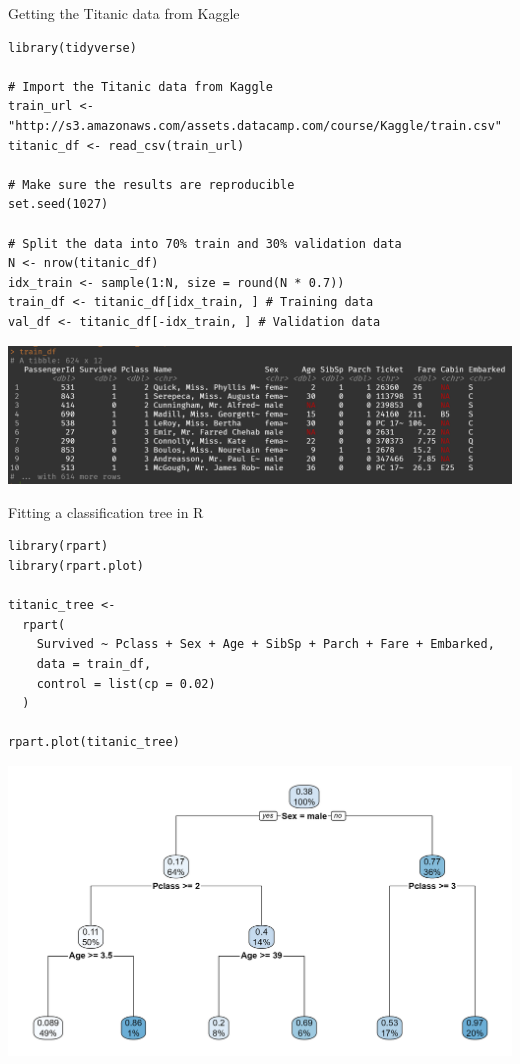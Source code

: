 \documentclass[xcolor=table,aspectratio=169]{beamer}
\begin{document}
\begin{frame}[fragile]{Getting the Titanic data from Kaggle}
	\begin{scriptsize}
		\begin{verbatim}
library(tidyverse)

# Import the Titanic data from Kaggle
train_url <- 
"http://s3.amazonaws.com/assets.datacamp.com/course/Kaggle/train.csv"
titanic_df <- read_csv(train_url)

# Make sure the results are reproducible
set.seed(1027)

# Split the data into 70% train and 30% validation data
N <- nrow(titanic_df)
idx_train <- sample(1:N, size = round(N * 0.7))
train_df <- titanic_df[idx_train, ] # Training data
val_df <- titanic_df[-idx_train, ] # Validation data
\end{verbatim}
	\end{scriptsize}
\end{frame}

\begin{frame}
	\includegraphics[width=\textwidth]{pics/titanic_scr}
\end{frame}


\begin{frame}[fragile]{Fitting a classification tree in R}
	
	\begin{scriptsize}
		\begin{verbatim}
library(rpart)
library(rpart.plot)

titanic_tree <- 
  rpart(
    Survived ~ Pclass + Sex + Age + SibSp + Parch + Fare + Embarked, 
    data = train_df, 
    control = list(cp = 0.02)
  )
  
rpart.plot(titanic_tree)

\end{verbatim}
		
	\end{scriptsize}
\end{frame}

\begin{frame}
	\includegraphics[width=\textwidth]{pics/rpart_plot}
\end{frame}
\end{document}
